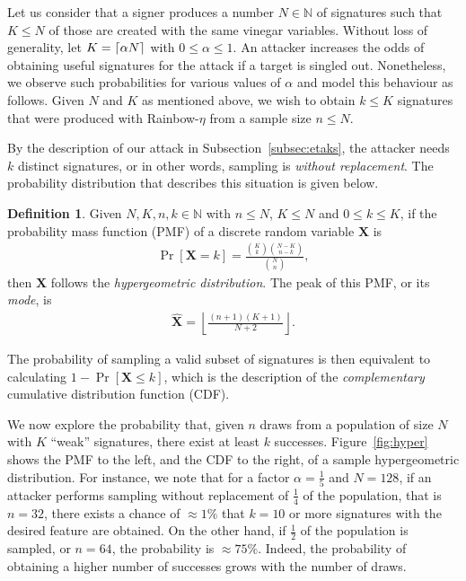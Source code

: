 \documentclass[12pt, a4paper, oneside]{memoir}
\DeclarePairedDelimiter{\ceil}{\lceil}{\rceil}
\theoremstyle{definition}
\newtheorem{definition}[theorem]{Definition}
\begin{document}
Let us consider that a signer produces a number $N \in \mathbb{N}$ of signatures such that $K \leq N$ of those are created with the same vinegar variables. Without loss of generality, let $K = \ceil{\alpha N}$ with $0 \leq \alpha \leq 1$. An attacker increases the odds of obtaining useful signatures for the attack if a target is singled out. Nonetheless, we observe such probabilities for various values of $\alpha$ and model this behaviour as follows. Given $N$ and $K$ as mentioned above, we wish to obtain $k \leq K$ signatures that were produced with Rainbow-$\eta$ from a sample size $n \leq N$. 

By the description of our attack in Subsection~\ref{subsec:etaks}, the attacker needs $k$ distinct signatures, or in other words, sampling is \emph{without replacement}. The probability distribution that describes this situation is given below.
\begin{definition}
  Given $N, K, n, k \in \mathbb{N}$ with $n \leq N$, $K \leq N$ and $0 \leq k \leq K$, if the probability mass function (PMF) of a discrete random variable $\mathbf{X}$ is
  \begin{align*}
    \Pr[\mathbf{X} = k] = \frac{\binom{K}{k}\binom{N - K}{n - k}}{\binom{N}{n}},
  \end{align*}
  then $\mathbf{X}$ follows the \emph{hypergeometric distribution}. The peak of this PMF, or its \emph{mode}, is
  \begin{align*}
    \widehat{\mathbf{X}} = \left\lfloor \frac{(n + 1)(K + 1)}{N + 2} \right\rfloor.
  \end{align*}
\end{definition}
The probability of sampling a valid subset of signatures is then equivalent to calculating $1 - \Pr[\mathbf{X} \leq k]$, which is the description of the \emph{complementary} cumulative distribution function (CDF).

We now explore the probability that, given $n$ draws from a population of size $N$ with $K$ ``weak'' signatures, there exist at least $k$ successes. Figure~\ref{fig:hyper} shows the PMF to the left, and the CDF to the right, of a sample hypergeometric distribution. For instance, we note that for a factor $\alpha = \frac{1}{5}$ and $N = 128$, if an attacker performs sampling without replacement of $\frac{1}{4}$ of the population, that is $n = 32$, there exists a chance of $\approx 1\%$ that $k = 10$ or more signatures with the desired feature are obtained. On the other hand, if $\frac{1}{2}$ of the population is sampled, or $n = 64$, the probability is $\approx 75\%$. Indeed, the probability of obtaining a higher number of successes grows with the number of draws.
\end{document}
